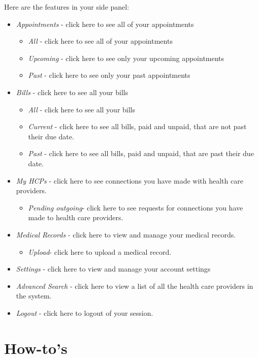 \documentclass[10pt]{report}
\begin{document}
Here are the features in your side panel:
\begin{itemize}
\item \textit{Appointments} - click here to see all of your appointments
\begin{itemize}
\item \textit{All} - click here to see all of your appointments
\item \textit{Upcoming} - click here to see only your upcoming appointments
\item \textit{Past} - click here to see only your past appointments
\end{itemize}
\item \textit{Bills} - click here to see all your bills
\begin{itemize} 
\item \textit{All} - click here to see all your bills
\item \textit{Current} - click here to see all bills, paid and unpaid, that are not past their due date.
\item \textit{Past}  - click here to see all bills, paid and unpaid, that are past their due date.
\end{itemize}
\item \textit{My HCPs} - click here to see connections you have made with health care providers.
\begin{itemize}
\item \textit{Pending outgoing}- click here to see requests for connections you have made to health care providers.
\end{itemize}
\item \textit{Medical Records} - click here to view and manage your medical records.
\begin{itemize}
\item \textit{Upload}- click here to upload a medical record.
\end{itemize}
\item \textit{Settings} - click here to view and manage your account settings
\item \textit{Advanced Search} - click here to view a list of all the health care providers in the system.
\item \textit{Logout} - click here to logout of your session.
\end{itemize}

\section{How-to's}
\end{document}
